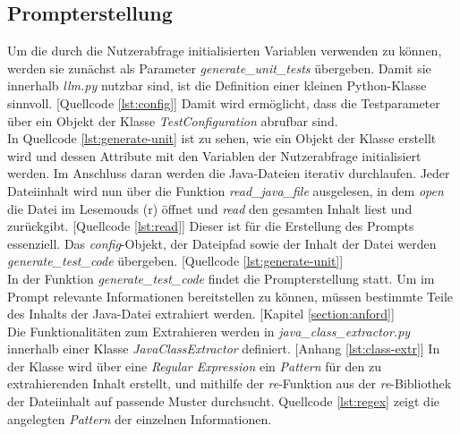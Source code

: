 \subsection{Prompterstellung}
Um die durch die Nutzerabfrage initialisierten Variablen verwenden zu können, werden sie zunächst als Parameter \textit{generate\_unit\_tests} übergeben. Damit sie innerhalb \textit{llm.py} nutzbar sind, ist die Definition einer kleinen Python-Klasse sinnvoll. [Quellcode \ref{lst:config}] Damit wird ermöglicht, dass die Testparameter über ein Objekt der Klasse \textit{TestConfiguration} abrufbar sind.\\
\vspace{-.3cm}
In Quellcode \ref{lst:generate-unit} ist zu sehen, wie ein Objekt der Klasse erstellt wird und dessen Attribute mit den Variablen der Nutzerabfrage initialisiert werden. Im Anschluss daran werden die Java-Dateien iterativ durchlaufen. Jeder Dateiinhalt wird nun über die Funktion \textit{read\_java\_file} ausgelesen, in dem \textit{open} die Datei im Lesemouds (r) öffnet und \textit{read} den gesamten Inhalt liest und zurückgibt. [Quellcode \ref{lst:read}] Dieser ist für die Erstellung des Prompts essenziell. Das \textit{config}-Objekt, der Dateipfad sowie der Inhalt der Datei werden \textit{generate\_test\_code} übergeben. [Quellcode \ref{lst:generate-unit}]\\
\vspace{0.5cm}
\vspace{-.3cm}
In der Funktion \textit{generate\_test\_code} findet die Prompterstellung statt. Um im Prompt relevante Informationen bereitstellen zu können, müssen bestimmte Teile des Inhalts der Java-Datei extrahiert werden. [Kapitel \ref{section:anford}]\\ Die Funktionalitäten zum Extrahieren werden in \textit{java\_class\_extractor.py} innerhalb einer Klasse \textit{JavaClassExtractor} definiert. [Anhang \ref{lst:class-extr}] In der Klasse wird über eine \textit{Regular Expression} ein \textit{Pattern} für den zu extrahierenden Inhalt erstellt, und mithilfe der \textit{re}-Funktion aus der \textit{re}-Bibliothek der Dateiinhalt auf passende Muster durchsucht. Quellcode \ref{lst:regex} zeigt die angelegten \textit{Pattern} der einzelnen Informationen.\\
